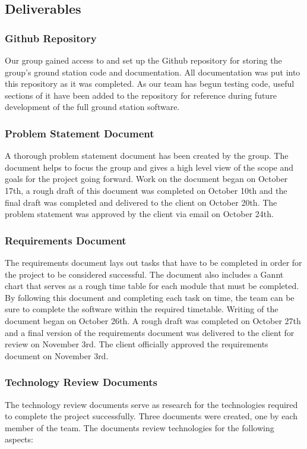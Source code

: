 \subsection{Deliverables}
\subsubsection{Github Repository}
Our group gained access to and set up the Github repository for storing the group's ground station code and documentation.
All documentation was put into this repository as it was completed.
As our team has begun testing code, useful sections of it have been added to the repository for reference during future development of the full ground station software.

\subsubsection{Problem Statement Document}
A thorough problem statement document has been created by the group.
The document helps to focus the group and gives a high level view of the scope and goals for the project going forward.
Work on the document began on October 17th, a rough draft of this document was completed on October 10th and the final draft was completed and delivered to the client on October 20th.
The problem statement was approved by the client via email on October 24th.

\subsubsection{Requirements Document}
The requirements document lays out tasks that have to be completed in order for the project to be considered successful.
The document also includes a Gannt chart that serves as a rough time table for each module that must be completed.
By following this document and completing each task on time, the team can be sure to complete the software within the required timetable.
Writing of the document began on October 26th.
A rough draft was completed on October 27th and a final version of the requirements document was delivered to the client for review on November 3rd.
The client officially approved the requirements document on November 3rd.

\subsubsection{Technology Review Documents}
The technology review documents serve as research for the technologies required to complete the project successfully.
Three documents were created, one by each member of the team.
The documents review technologies for the following aspects: 

